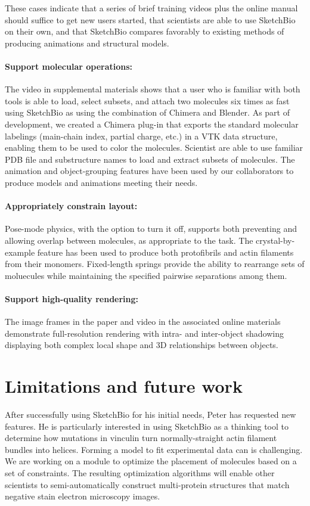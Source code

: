 \documentclass[twocolumn]{bmcart}%
\begin{document}
These cases indicate that a series of brief training videos plus the online manual should suffice to get new users started, that scientists are able to use SketchBio on their own, and that SketchBio compares favorably to existing methods of producing animations and structural models.

\paragraph*{Support molecular operations:}
The video in supplemental materials shows that a user who is familiar with both tools is able to load, select subsets, and attach two molecules six times as fast using SketchBio as using the combination of Chimera and Blender. As part of development, we created a Chimera plug-in that exports the standard molecular labelings (main-chain index, partial charge, etc.) in a VTK data structure, enabling them to be used to color the molecules. Scientist are able to use familiar PDB file and substructure names to load and extract subsets of molecules. The animation and object-grouping features have been used by our collaborators to produce models and animations meeting their needs.

\paragraph*{Appropriately constrain layout:}
Pose-mode physics, with the option to turn it off, supports both preventing and allowing overlap between molecules, as appropriate to the task. The crystal-by-example feature has been used to produce both protofibrils and actin filaments from their monomers. Fixed-length springs provide the ability to rearrange sets of moluecules while maintaining the specified pairwise separations among them.

\paragraph*{Support high-quality rendering:}
The image frames in the paper and video in the associated online materials demonstrate full-resolution rendering with intra- and inter-object shadowing displaying both complex local shape and 3D relationships between objects.

\section*{Limitations and future work}
After successfully using SketchBio for his initial needs, Peter has requested new features.
He is particularly interested in using SketchBio as a thinking tool to determine how mutations in vinculin turn normally-straight actin filament bundles into helices.
Forming a model to fit experimental data can is challenging.  We are working on a module to optimize the placement of molecules based on a set of constraints.
The resulting optimization algorithms will enable other scientists to semi-automatically construct multi-protein structures that match negative stain electron microscopy images.
\end{document}
